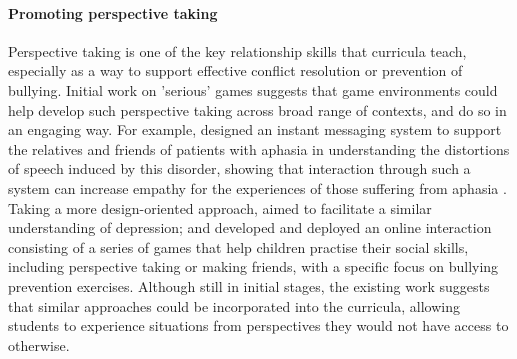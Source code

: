 \documentclass[prodmode,acmtochi]{acmsmall}
\newcommand{\rephrase}[1]{\textrm{\textrm{\textcolor{gray}{#1}}}}
\begin{document}
\paragraph{Promoting perspective taking} Perspective taking is one of the key relationship skills that curricula teach, especially as a way to support effective conflict resolution or prevention of bullying. Initial work on 'serious' games suggests that game environments could help develop such perspective taking across broad range of contexts, and do so in an engaging way. For example,  designed an instant messaging system to support the relatives and friends of patients with aphasia in understanding the distortions of speech induced by this disorder, showing that interaction through such a system can increase empathy for the experiences of those suffering from aphasia \cite{Hailpern2011}. Taking a more design-oriented approach,  aimed to facilitate a similar understanding of depression; and  developed and deployed an online interaction consisting of a series of games that help children practise their social skills, including perspective taking or making friends, with a specific focus on bullying prevention exercises. Although still in initial stages, the existing work suggests that similar approaches could be incorporated into the curricula, allowing students to experience situations from perspectives they would not have access to otherwise. 




\end{document}
